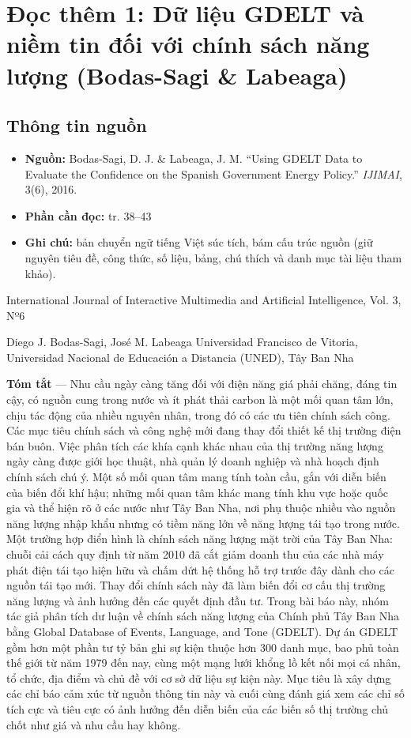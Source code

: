 \chapter{Đọc thêm 1: Dữ liệu GDELT và niềm tin đối với chính sách năng lượng (Bodas-Sagi \& Labeaga)}
\label{ch:M5L3DocThem1}

\section{Thông tin nguồn}

\begin{itemize}
  \item \textbf{Nguồn:} Bodas-Sagi, D. J. \& Labeaga, J. M. ``Using GDELT Data to Evaluate the Confidence on the Spanish Government Energy Policy.'' \emph{IJIMAI}, 3(6), 2016.
  \item \textbf{Phần cần đọc:} tr. 38--43
  \item \textbf{Ghi chú:} bản chuyển ngữ tiếng Việt súc tích, bám cấu trúc nguồn (giữ nguyên tiêu đề, công thức, số liệu, bảng, chú thích và danh mục tài liệu tham khảo).
\end{itemize}

International Journal of Interactive Multimedia and Artificial Intelligence, Vol. 3, Nº6

Diego J. Bodas-Sagi, José M. Labeaga Universidad Francisco de Vitoria, Universidad Nacional de Educación a Distancia (UNED), Tây Ban Nha

\textbf{Tóm tắt} --- Nhu cầu ngày càng tăng đối với điện năng giá phải chăng, đáng tin cậy, có nguồn cung trong nước và ít phát thải carbon là một mối quan tâm lớn, chịu tác động của nhiều nguyên nhân, trong đó có các ưu tiên chính sách công. Các mục tiêu chính sách và công nghệ mới đang thay đổi thiết kế thị trường điện bán buôn. Việc phân tích các khía cạnh khác nhau của thị trường năng lượng ngày càng được giới học thuật, nhà quản lý doanh nghiệp và nhà hoạch định chính sách chú ý. Một số mối quan tâm mang tính toàn cầu, gắn với diễn biến của biến đổi khí hậu; những mối quan tâm khác mang tính khu vực hoặc quốc gia và thể hiện rõ ở các nước như Tây Ban Nha, nơi phụ thuộc nhiều vào nguồn năng lượng nhập khẩu nhưng có tiềm năng lớn về năng lượng tái tạo trong nước. Một trường hợp điển hình là chính sách năng lượng mặt trời của Tây Ban Nha: chuỗi cải cách quy định từ năm 2010 đã cắt giảm doanh thu của các nhà máy phát điện tái tạo hiện hữu và chấm dứt hệ thống hỗ trợ trước đây dành cho các nguồn tái tạo mới. Thay đổi chính sách này đã làm biến đổi cơ cấu thị trường năng lượng và ảnh hưởng đến các quyết định đầu tư. Trong bài báo này, nhóm tác giả phân tích dư luận về chính sách năng lượng của Chính phủ Tây Ban Nha bằng Global Database of Events, Language, and Tone (GDELT). Dự án GDELT gồm hơn một phần tư tỷ bản ghi sự kiện thuộc hơn 300 danh mục, bao phủ toàn thế giới từ năm 1979 đến nay, cùng một mạng lưới khổng lồ kết nối mọi cá nhân, tổ chức, địa điểm và chủ đề với cơ sở dữ liệu sự kiện này. Mục tiêu là xây dựng các chỉ báo cảm xúc từ nguồn thông tin này và cuối cùng đánh giá xem các chỉ số tích cực và tiêu cực có ảnh hưởng đến diễn biến của các biến số thị trường chủ chốt như giá và nhu cầu hay không.

